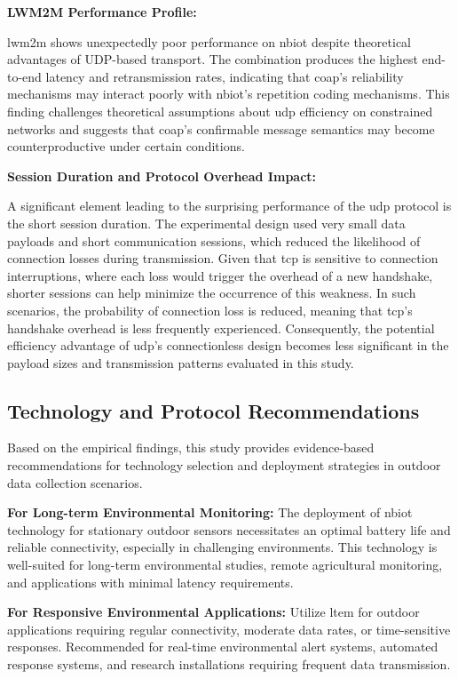 \documentclass[12pt, english, openany]{book}
\begin{document}
\textbf{LWM2M Performance Profile:}

\gls{lwm2m} shows unexpectedly poor performance on \gls{nbiot} despite theoretical advantages of UDP-based transport. The combination produces the highest end-to-end latency and retransmission rates, indicating that \gls{coap}'s reliability mechanisms may interact poorly with \gls{nbiot}'s repetition coding mechanisms. This finding challenges theoretical assumptions about \gls{udp} efficiency on constrained networks and suggests that \gls{coap}'s confirmable message semantics may become counterproductive under certain conditions.

\textbf{Session Duration and Protocol Overhead Impact:}

A significant element leading to the surprising performance of the \gls{udp} protocol is the short session duration. The experimental design used very small data payloads and short communication sessions, which reduced the likelihood of connection losses during transmission. Given that \gls{tcp} is sensitive to connection interruptions, where each loss would trigger the overhead of a new handshake, shorter sessions can help minimize the occurrence of this weakness. In such scenarios, the probability of connection loss is reduced, meaning that \gls{tcp}'s handshake overhead is less frequently experienced. Consequently, the potential efficiency advantage of \gls{udp}'s connectionless design becomes less significant in the payload sizes and transmission patterns evaluated in this study.

\subsection{Technology and Protocol Recommendations}

Based on the empirical findings, this study provides evidence-based recommendations for technology selection and deployment strategies in outdoor data collection scenarios.

\textbf{For Long-term Environmental Monitoring:} The deployment of \gls{nbiot} technology for stationary outdoor sensors necessitates an optimal battery life and reliable connectivity, especially in challenging environments. This technology is well-suited for long-term environmental studies, remote agricultural monitoring, and applications with minimal latency requirements.

\textbf{For Responsive Environmental Applications:} Utilize \gls{ltem} for outdoor applications requiring regular connectivity, moderate data rates, or time-sensitive responses. Recommended for real-time environmental alert systems, automated response systems, and research installations requiring frequent data transmission.
\end{document}
